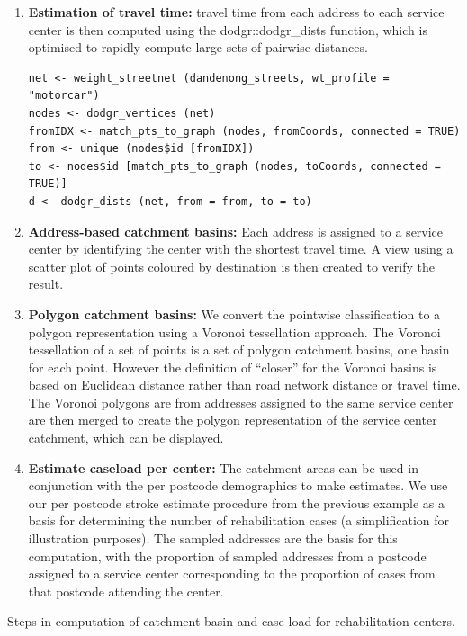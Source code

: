\documentclass[utf8]{frontiersHLTH}
\begin{document}
\begin{table}[h]
\begin{center}
\begin{mdframed}[backgroundcolor=blue!20]
\begin{enumerate}
\item
  {\bf Estimation of travel time:} travel time from each address to each
  service center is then computed using the dodgr::dodgr\_dists
  function, which is optimised to rapidly compute large sets of pairwise
  distances.
\begin{lstlisting}
net <- weight_streetnet (dandenong_streets, wt_profile = "motorcar")
nodes <- dodgr_vertices (net)
fromIDX <- match_pts_to_graph (nodes, fromCoords, connected = TRUE)
from <- unique (nodes$id [fromIDX])
to <- nodes$id [match_pts_to_graph (nodes, toCoords, connected = TRUE)]
d <- dodgr_dists (net, from = from, to = to)
\end{lstlisting}
\item
  {\bf Address-based catchment basins:} Each address is assigned to a service
  center by identifying the center with the shortest travel time. A view
  using a scatter plot of points coloured by destination is then created
  to verify the result.
\item
  {\bf Polygon catchment basins:} We convert the pointwise classification to a
  polygon representation using a Voronoi tessellation approach. The
  Voronoi tessellation of a set of points is a set of polygon catchment
  basins, one basin for each point. However the definition of ``closer''
  for the Voronoi basins is based on Euclidean distance rather than road
  network distance or travel time. The Voronoi polygons are from
  addresses assigned to the same service center are then merged to
  create the polygon representation of the service center catchment,
  which can be displayed.
\item
  {\bf Estimate caseload per center:} The catchment areas can be used in
  conjunction with the per postcode demographics to make estimates. We
  use our per postcode stroke estimate procedure from the previous
  example as a basis for determining the number of rehabilitation cases
  (a simplification for illustration purposes). The sampled addresses
  are the basis for this computation, with the proportion of sampled
  addresses from a postcode assigned to a service center corresponding
  to the proportion of cases from that postcode attending the center.
\end{enumerate}
\end{mdframed}
\end{center}
\caption{Steps in computation of catchment basin and case load for
  rehabilitation centers. \label{tab:exampleB}}
\end{table}
\end{document}
